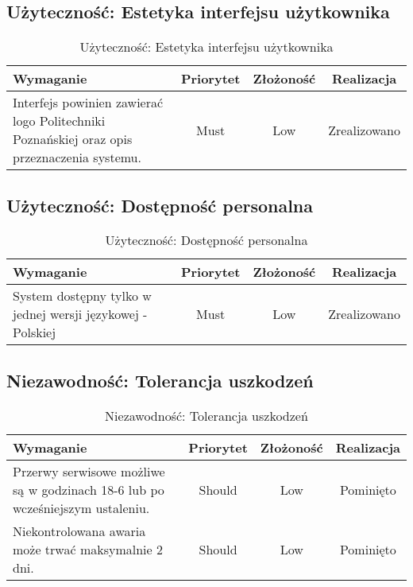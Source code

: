 \subsection{Użyteczność: Estetyka interfejsu użytkownika}

\begin{table}[H]
\centering
\begin{tabular}{ | p{8cm} | c | c | c | }
\hline
\textbf{Wymaganie} & \textbf{Priorytet} & \textbf{Złożoność} & \textbf{Realizacja} \\ \hline
Interfejs powinien zawierać logo Politechniki Poznańskiej oraz opis przeznaczenia systemu.
 & Must & Low & Zrealizowano \\ \hline
\end{tabular}
\caption{Użyteczność: Estetyka interfejsu użytkownika}\label{tab:reqs}
\end{table}

\subsection{Użyteczność: Dostępność personalna}

\begin{table}[H]
\centering
\begin{tabular}{ | p{8cm} | c | c | c | }
\hline
\textbf{Wymaganie} & \textbf{Priorytet} & \textbf{Złożoność} & \textbf{Realizacja} \\ \hline
System dostępny tylko w jednej wersji językowej - Polskiej
 & Must & Low & Zrealizowano \\ \hline
\end{tabular}
\caption{Użyteczność: Dostępność personalna}\label{tab:reqs}
\end{table}

\subsection{Niezawodność: Tolerancja uszkodzeń}

\begin{table}[H]
\centering
\begin{tabular}{ | p{8cm} | c | c | c | }
\hline
\textbf{Wymaganie} & \textbf{Priorytet} & \textbf{Złożoność} & \textbf{Realizacja} \\ \hline
Przerwy serwisowe możliwe są w godzinach 18-6 lub po wcześniejszym ustaleniu.
 & Should & Low & Pominięto \\ \hline
 Niekontrolowana awaria może trwać maksymalnie 2 dni. & Should & Low & Pominięto \\ \hline
\end{tabular}
\caption{Niezawodność: Tolerancja uszkodzeń}\label{tab:reqs}
\end{table}

